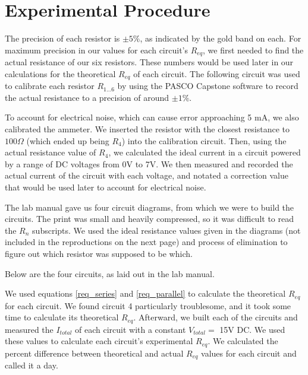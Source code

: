 \documentclass[12pt,letterpaper,titlepage]{report}
\begin{document}

\bigskip
\section*{Experimental Procedure}

The precision of each resistor is $\pm 5 \%$, as indicated by the gold band on each. For maximum precision in our values for each circuit's $R_{eq}$, we first needed to find the actual resistance of our six resistors. These numbers would be used later in our calculations for the theoretical $R_{eq}$ of each circuit. The following circuit was used to calibrate each resistor $R_{1 \ldots 6}$ by using the PASCO Capstone software to record the actual resistance to a precision of around $\pm 1\%$.

\begin{center}
    
\end{center}

To account for electrical noise, which can cause error approaching 5 mA, we also calibrated the ammeter. We inserted the resistor with the closest resistance to $100 \Omega$ (which ended up being $R_4$) into the calibration circuit. Then, using the actual resistance value of $R_4$, we calculated the ideal current in a circuit powered by a range of DC voltages from 0V to 7V. We then measured and recorded the actual current of the circuit with each voltage, and notated a correction value that would be used later to account for electrical noise.

\medskip
The lab manual gave us four circuit diagrams, from which we were to build the circuits. The print was small and heavily compressed, so it was difficult to read the $R_n$ subscripts. We used the ideal resistance values given in the diagrams (not included in the reproductions on the next page) and process of elimination to figure out which resistor was supposed to be which.

\pagebreak
Below are the four circuits, as laid out in the lab manual.

\bigskip
\begin{minipage}{\textwidth}
    \centering
    \bigskip
    
    \bigskip
\end{minipage}
\bigskip

We used equations \ref{req_series} and \ref{req_parallel} to calculate the theoretical $R_{eq}$ for each circuit. We found circuit 4 particularly troublesome, and it took some time to calculate its theoretical $R_{eq}$. Afterward, we built each of the circuits and measured the $I_{total}$ of each circuit with a constant $V_{total} =$ 15V DC. We used these values to calculate each circuit's experimental $R_{eq}$. We calculated the percent difference between theoretical and actual $R_{eq}$ values for each circuit and called it a day.
\end{document}
